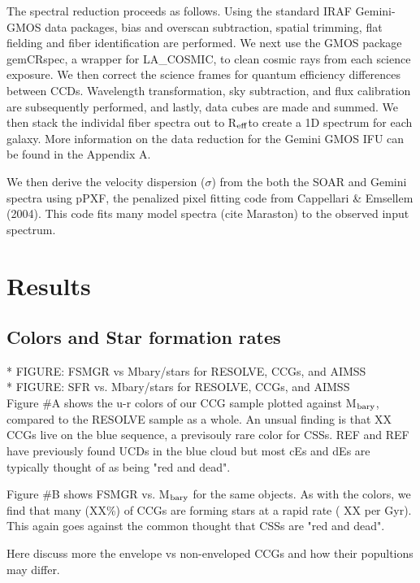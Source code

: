 \documentclass[iop,apj,twocolappendix]{emulateapj}
\newcommand{\Reff}{R$_{\rm eff}$}
\begin{document}
The spectral reduction proceeds as follows. Using the standard IRAF Gemini-GMOS data packages, bias and overscan subtraction, spatial trimming, flat fielding and fiber identification are performed. We next use the GMOS package gemCRspec, a wrapper for \textsc{LA\_COSMIC}, to clean cosmic rays from each science exposure. We then correct the science frames for quantum efficiency differences between CCDs. Wavelength transformation, sky subtraction, and flux calibration are subsequently performed, and lastly, data cubes are made and summed. We then stack the individal fiber spectra out to \Reff to create a 1D spectrum for each galaxy. More information on the data reduction for the Gemini GMOS IFU can be found in the Appendix A.

We then derive the velocity dispersion ($\sigma$) from the both the SOAR and Gemini spectra using {\sc pPXF}, the penalized pixel fitting code from Cappellari \& Emsellem (2004). This code fits many model spectra (cite Maraston) to the observed input spectrum.  

\section{Results}

\subsection{Colors and Star formation rates}
\noindent 
* FIGURE: FSMGR vs Mbary/stars for RESOLVE, CCGs, and AIMSS \\
* FIGURE: SFR vs. Mbary/stars for RESOLVE, CCGs, and AIMSS \\

\noindent Figure \#A shows the u-r colors of our CCG sample plotted against M$_{\rm bary}$, compared to the RESOLVE sample as a whole. An unsual finding is that XX CCGs live on the blue sequence, a previsouly rare color for CSSs. REF and REF have previously found UCDs in the blue cloud but most cEs and dEs are typically thought of as being "red and dead".

Figure \#B shows FSMGR vs. M$_{\rm bary}$ for the same objects. As with the colors, we find that many (XX\%) of CCGs are forming stars at a rapid rate ( XX per Gyr). This again goes against the common thought that CSSs are "red and dead".

Here discuss more the envelope vs non-enveloped CCGs and how their popultions may differ.
\end{document}
